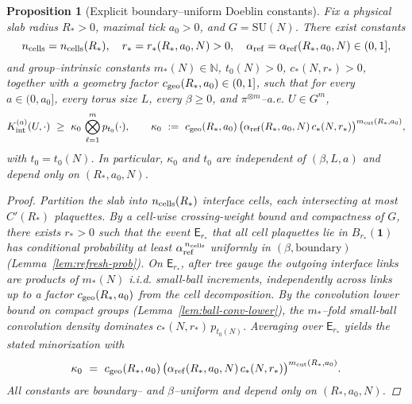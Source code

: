 \documentclass[11pt]{amsart}
\theoremstyle{plain}
\newtheorem{proposition}[theorem]{Proposition}
\theoremstyle{definition}
\theoremstyle{remark}
\begin{document}
\begin{proposition}[Explicit boundary–uniform Doeblin constants]\label{prop:explicit-doeblin-constants}
Fix a physical slab radius $R_*>0$, maximal tick $a_0>0$, and $G=\mathrm{SU}(N)$. There exist constants
\[
  n_{\rm cells}=n_{\rm cells}(R_*),\quad r_*=r_*(R_*,a_0,N)>0,\quad \alpha_{\rm ref}=\alpha_{\rm ref}(R_*,a_0,N)\in(0,1],
\]
and group–intrinsic constants $m_*(N)\in\mathbb N$, $t_0(N)>0$, $c_*(N,r_*)>0$, together with a geometry factor $c_{\rm geo}(R_*,a_0)\in(0,1]$, such that for every $a\in(0,a_0]$, every torus size $L$, every $\beta\ge 0$, and $\pi^{\otimes m}$–a.e. $U\in G^m$,
\[
  K_{\rm int}^{(a)}(U,\cdot)\ \ge\ \kappa_0\,\bigotimes_{\ell=1}^m p_{t_0}(\cdot),\qquad
  \kappa_0\ :=\ c_{\rm geo}(R_*,a_0)\,\big(\alpha_{\rm ref}(R_*,a_0,N)\,c_*(N,r_*)\big)^{m_{\rm cut}(R_*,a_0)},
\]
with $t_0=t_0(N)$. In particular, $\kappa_0$ and $t_0$ are independent of $(\beta,L,a)$ and depend only on $(R_*,a_0,N)$.

\begin{proof}
Partition the slab into $n_{\rm cells}(R_*)$ interface cells, each intersecting at most $C'(R_*)$ plaquettes. By a cell-wise crossing-weight bound and compactness of $G$, there exists $r_*>0$ such that the event $\mathsf E_{r_*}$ that all cell plaquettes lie in $B_{r_*}(\mathbf 1)$ has conditional probability at least $\alpha_{\rm ref}^{\,n_{\rm cells}}$ uniformly in $(\beta,\text{boundary})$ (Lemma~\ref{lem:refresh-prob}). On $\mathsf E_{r_*}$, after tree gauge the outgoing interface links are products of $m_*(N)$ i.i.d. small-ball increments, independently across links up to a factor $c_{\rm geo}(R_*,a_0)$ from the cell decomposition. By the convolution lower bound on compact groups (Lemma~\ref{lem:ball-conv-lower}), the $m_*$–fold small-ball convolution density dominates $c_*(N,r_*)\,p_{t_0(N)}$. Averaging over $\mathsf E_{r_*}$ yields the stated minorization with
\[
  \kappa_0\ =\ c_{\rm geo}(R_*,a_0)\,\big(\alpha_{\rm ref}(R_*,a_0,N)\,c_*(N,r_*)\big)^{m_{\rm cut}(R_*,a_0)}.
\]
All constants are boundary– and $\beta$–uniform and depend only on $(R_*,a_0,N)$.
\end{proof}
\end{proposition}
\end{document}
